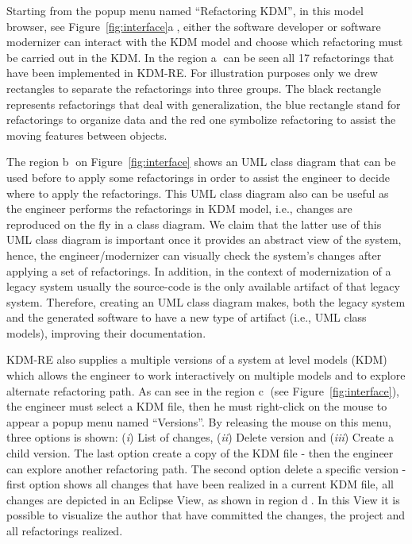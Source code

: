 \documentclass[12pt]{article}
\begin{document}

Starting from the popup menu named ``Refactoring KDM'', in this model browser, see Figure~\ref{fig:interface}\textcircled{a}, either the software developer or software modernizer can interact with the KDM model and choose which refactoring must be carried out in the KDM.
%
In the region \textcircled{a} can be seen all 17 refactorings that have been implemented in KDM-RE. 
For illustration purposes only we drew rectangles to separate the refactorings into three groups. 
The black rectangle represents refactorings that deal with generalization, the blue rectangle stand for refactorings to organize data and the red one symbolize refactoring to assist the moving features between objects.


The region \textcircled{b} on Figure~\ref{fig:interface} shows an UML class diagram that can be used before to apply some refactorings in order to assist the engineer to decide where to apply the refactorings. This UML class diagram also can be useful as the engineer performs the refactorings in KDM model, i.e., changes are reproduced on the fly in a class diagram.
We claim that the latter use of this UML class diagram is important once it provides an abstract view of the system, hence, the engineer/modernizer can visually check the system's changes after applying a set of refactorings. 
In addition, in the context of modernization of a legacy system usually the source-code is the only available artifact of that legacy system. 
Therefore, creating an UML class diagram makes, both the legacy system and the generated software to have a new type of artifact (i.e., UML class models), improving their documentation.

KDM-RE also supplies a multiple versions of a system at level models (KDM) which allows the engineer to work interactively on multiple models and to explore alternate refactoring path. As can see in the region \textcircled{c} (see Figure~\ref{fig:interface}), the engineer must select a KDM file, then he must right-click on the mouse to appear a popup menu named ``Versions''. By releasing the mouse on this menu, three options is shown: (\textit{i}) List of changes, (\textit{ii}) Delete version and (\textit{iii}) Create a child version. The last option create a copy of the KDM file - then the engineer can explore another refactoring path. The second option delete a specific version - first option shows all changes that have been realized in a current KDM file, all changes are depicted in an Eclipse View, as shown in region \textcircled{d}. In this View it is possible to visualize the author that have committed the changes, the project and all refactorings realized.
\end{document}
